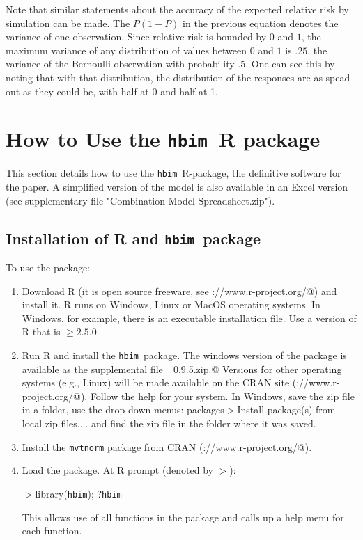 \documentclass{article}[12pt]
\newcommand{\pname}{\texttt{hbim}}
\begin{document}
Note that similar statements about the accuracy of the expected relative risk by simulation can be made. 
The $P(1-P)$ in the previous equation denotes the variance of one observation. Since relative risk is bounded by
$0$ and $1$, the maximum variance of any distribution of values between $0$ and $1$ is $.25$, the variance of the 
Bernoulli observation with probability $.5$. One can see this by noting that with that distribution, the distribution
of the responses are as spead out as they could be, with half at 0 and half at 1.  

\appendix



\section{How to Use the \pname\ R package}
\label{app:Rcode}

This section details how to use the \pname\ R-package, the definitive software for the paper. 
A simplified version of the model is 
also available in an Excel version (see supplementary file "Combination Model Spreadsheet.zip"). 

\subsection{Installation of R and \pname\ package}

To use the package: 
\begin{enumerate}
\item Download R (it is open source freeware, see  \verb@http://www.r-project.org/@) and install it. R  
runs on Windows, Linux or MacOS operating systems. In Windows, for example,  
 there is an executable installation file. Use a version of R that is  $\geq 2.5.0.$
\item Run R and install the \pname\ package. The windows version of the package is available as the supplemental file 
\verb@hbim_0.9.5.zip.@ Versions for other operating systems (e.g., Linux) will be made available on the CRAN site (\verb@http://www.r-project.org/@).  
Follow the help for your system. In Windows, save the zip file in a folder, use the drop down menus: 
{\sf packages$>$Install package(s) from local zip files....} and find the zip file in the folder where it was saved.
\item Install the \texttt{mvtnorm}  package from CRAN (\verb@http://www.r-project.org/@). 
\item Load the package. At R prompt  (denoted by $>$): 

$>$library(\pname); ?\pname\

This allows use of all functions in the package and calls up a 
help menu for each function.  
\end{enumerate}
\end{document}
